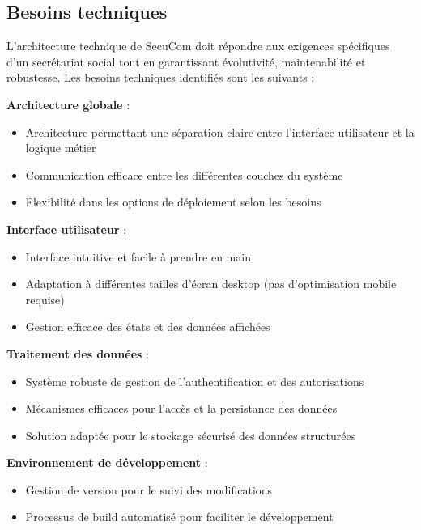 \subsection{Besoins techniques}

L'architecture technique de SecuCom doit répondre aux exigences spécifiques d'un secrétariat social tout en garantissant évolutivité, maintenabilité et robustesse. Les besoins techniques identifiés sont les suivants :

\vspace{0.5cm}
\textbf{Architecture globale} :
\begin{itemize}[leftmargin=*,label=\textcolor{darkgray}{$\bullet$},itemsep=0.3em]
  \item Architecture permettant une séparation claire entre l'interface utilisateur et la logique métier
  \item Communication efficace entre les différentes couches du système
  \item Flexibilité dans les options de déploiement selon les besoins
\end{itemize}


\vspace{0.5cm}
\textbf{Interface utilisateur} :
\begin{itemize}[leftmargin=*,label=\textcolor{darkgray}{$\bullet$},itemsep=0.3em]
  \item Interface intuitive et facile à prendre en main
  \item Adaptation à différentes tailles d'écran desktop (pas d'optimisation mobile requise)
  \item Gestion efficace des états et des données affichées
\end{itemize}


\vspace{0.5cm}
\textbf{Traitement des données} :
\begin{itemize}[leftmargin=*,label=\textcolor{darkgray}{$\bullet$},itemsep=0.3em]
  \item Système robuste de gestion de l'authentification et des autorisations
  \item Mécanismes efficaces pour l'accès et la persistance des données
  \item Solution adaptée pour le stockage sécurisé des données structurées
\end{itemize}


\vspace{0.5cm}
\textbf{Environnement de développement} :
\begin{itemize}[leftmargin=*,label=\textcolor{darkgray}{$\bullet$},itemsep=0.3em]
  \item Gestion de version pour le suivi des modifications
  \item Processus de build automatisé pour faciliter le développement
\end{itemize}

